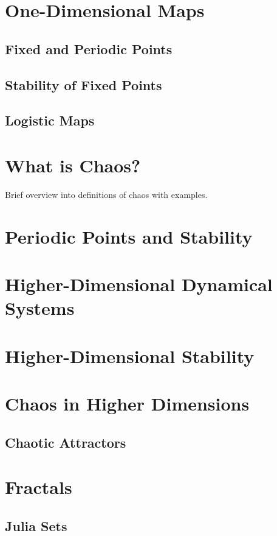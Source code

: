 \documentclass[11pt]{article}
\theoremstyle{definition}
\begin{document}
\section{One-Dimensional Maps}
\subsection{Fixed and Periodic Points}
\subsection{Stability of Fixed Points}
\subsection{Logistic Maps}
\section{What is Chaos?}
Brief overview into definitions of chaos with examples.
\section{Periodic Points and Stability}
\section{Higher-Dimensional Dynamical Systems}
\section{Higher-Dimensional Stability}
\section{Chaos in Higher Dimensions}
\subsection{Chaotic Attractors}
\section{Fractals}
\subsection{Julia Sets}


\end{document}
